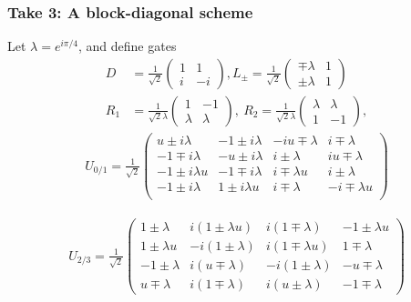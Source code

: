 \documentclass{beamer}
\begin{document}
\begin{frame}
\frametitle{Take 3: A block-diagonal scheme}
Let $\lambda = e^{i\pi /4}$, and define gates
\begin{align*}
        D &= \frac{1}{\sqrt{2}}
            \begin{pmatrix}
                1 & 1\\
                i & -i
            \end{pmatrix} ,
        L_\pm = \frac{1}{\sqrt{2}}
            \begin{pmatrix}
            \mp \lambda & 1 \\
             \pm \lambda & 1
            \end{pmatrix}
        \\
        R_1 &= \frac{1}{\sqrt{2}\lambda}
            \begin{pmatrix}
            1 & -1 \\
             \lambda & \lambda
            \end{pmatrix},
            \
        R_2 = \frac{1}{\sqrt{2}\lambda}
            \begin{pmatrix}
            \lambda & \lambda \\
            1 & -1
            \end{pmatrix},
\end{align*}
\begin{align*}
    U_{0/1} = \frac{1}{\sqrt{2}}
    \begin{pmatrix}
     u \pm i \lambda  & -1 \pm i \lambda  &  -i u \mp \lambda & i \mp \lambda \\
    -1 \mp i \lambda & -u \pm i \lambda  & i \pm \lambda & iu \mp \lambda\\
    -1 \pm i \lambda  u & -1 \mp i \lambda  & i \mp \lambda  u & i \pm \lambda \\
    -1 \pm i \lambda  & 1 \pm i \lambda  u & i \mp \lambda & -i \mp \lambda u\\
    \end{pmatrix}
\end{align*}

\begin{align*}
    U_{2/3} = \frac{1}{\sqrt{2}}
    \begin{pmatrix}
    1 \pm \lambda & i (1 \pm \lambda  u) & i (1 \mp \lambda) & -1 \pm \lambda  u \\
   1 \pm \lambda  u & -i (1 \pm \lambda) & i (1 \mp \lambda u) & 1 \mp \lambda  \\
    -1 \pm \lambda & i (u \mp \lambda ) & -i (1 \pm \lambda ) & -u \mp \lambda \\
    u \mp \lambda  & i (1 \mp \lambda) & i (u \pm \lambda ) & -1 \mp 
    \lambda
    \end{pmatrix}
\end{align*}
\end{frame}
\end{document}
